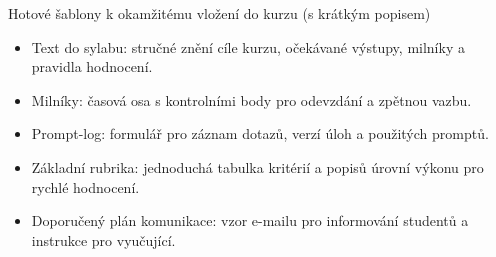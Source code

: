 \bigskip

Hotové šablony k okamžitému vložení do kurzu (s krátkým popisem)
\begin{itemize}
  \item Text do sylabu: stručné znění cíle kurzu, očekávané výstupy, milníky a pravidla hodnocení.
  \item Milníky: časová osa s kontrolními body pro odevzdání a zpětnou vazbu.
  \item Prompt-log: formulář pro záznam dotazů, verzí úloh a použitých promptů.
  \item Základní rubrika: jednoduchá tabulka kritérií a popisů úrovní výkonu pro rychlé hodnocení.
  \item Doporučený plán komunikace: vzor e-mailu pro informování studentů a instrukce pro vyučující.
\end{itemize}